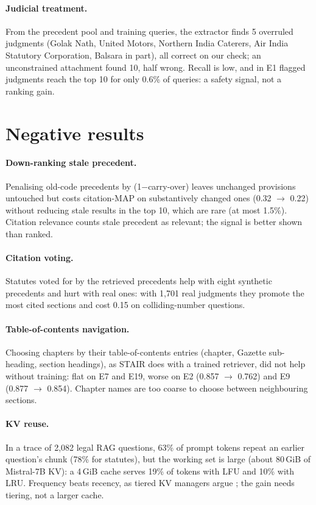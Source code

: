 \documentclass[11pt]{article}
\begin{document}
\paragraph{Judicial treatment.} From the precedent pool and training queries, the extractor finds
5 overruled judgments (Golak Nath, United Motors, Northern India Caterers, Air India Statutory
Corporation, Balsara in part), all correct on our check;
an unconstrained attachment found 10, half wrong. Recall is low, and in E1 flagged judgments reach
the top 10 for only 0.6\% of queries: a safety signal, not a ranking gain.

\section{Negative results}
\paragraph{Down-ranking stale precedent.} Penalising old-code precedents by (1$-$carry-over) leaves
unchanged provisions untouched but costs citation-MAP on substantively changed ones (0.32
$\rightarrow$ 0.22) without reducing stale results in the top 10, which are rare (at most 1.5\%).
Citation relevance counts stale precedent as relevant; the signal is better shown than ranked.
\paragraph{Citation voting.} Statutes voted for by the retrieved precedents help with eight
synthetic precedents and hurt with real ones: with 1,701 real judgments they promote the most cited
sections and cost 0.15 on colliding-number questions.
\paragraph{Table-of-contents navigation.} Choosing chapters by their table-of-contents entries
(chapter, Gazette sub-heading, section headings), as STAIR does with a trained retriever, did not
help without training: flat on E7 and E19, worse on E2 (0.857 $\rightarrow$ 0.762) and E9 (0.877
$\rightarrow$ 0.854). Chapter names are too coarse to choose between neighbouring sections.
\paragraph{KV reuse.} In a trace of 2,082 legal RAG questions, 63\% of prompt tokens repeat an
earlier question's chunk (78\% for statutes), but the working set is large (about 80\,GiB of
Mistral-7B KV): a 4\,GiB cache serves 19\% of tokens with LFU and 10\% with LRU. Frequency beats
recency, as tiered KV managers argue \citep{pactkv}; the gain needs tiering, not a larger cache.
\end{document}

